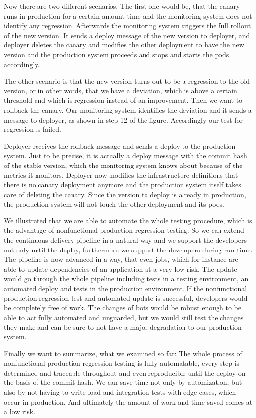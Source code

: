 Now there are two different scenarios. The first one would be, that the canary runs in
production for a certain amount time and the monitoring system does not identify any
regression. Afterwards the monitoring system triggers the full rollout of the new
version. It sends a deploy message of the new version to deployer, and deployer deletes
the canary and modifies the other deployment to have the new version and the production
system proceeds and stops and starts the pods accordingly.

The other scenario is that the new version turns out to be a regression to the old
version, or in other words, that we have a deviation, which is above a certain threshold
and which is regression instead of an improvement. Then we want to rollback the
canary. Our monitoring system identifies the deviation and it sends a message to deployer,
as shown in step 12 of the figure. Accordingly our test for regression is failed.

Deployer receives the rollback message and sends a deploy to the production system. Just
to be precise, it is actually a deploy message with the commit hash of the stable version,
which the monitoring system knows about because of the metrics it monitors. Deployer now
modifies the infrastructure definitions that there is no canary deployment anymore and the
production system itself takes care of deleting the canary. Since the version to deploy is
already in production, the production system will not touch the other deployment and its
pods.

We illustrated that we are able to automate the whole testing procedure, which is the
advantage of nonfunctional production regression testing. So we can extend the continuous
delivery pipeline in a natural way and we support the developers not only until the
deploy, furthermore we support the developers during run time. The pipeline is now
advanced in a way, that even jobs, which for instance are able to update dependencies of
an application at a very low risk. The update would go through the whole pipeline
including tests in a testing environment, an automated deploy and tests in the production
environment. If the nonfunctional production regression test and automated update is
successful, developers would be completely free of work. The changes of bots would be
robust enough to be able to act fully automated and unguarded, but we would still test the
changes they make and can be sure to not have a major degradation to our production
system.

Finally we want to summarize, what we examined so far: The whole process of nonfunctional
production regression testing is fully automatable, every step is determined and traceable
throughout and even reproducible until the deploy on the basis of the commit hash. We can
save time not only by automization, but also by not having to write load and integration
tests with edge cases, which occur in production. And ultimately the amount of work and
time saved comes at a low risk.

